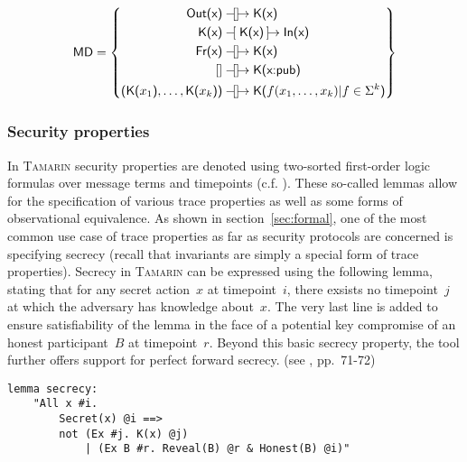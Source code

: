 \begin{equation*}
    \textsf{MD} = \left\{
        \begin{aligned}
            \textsf{Out(x)} &\ltracerule\rtracerule \textsf{K(x)}\\
            \textsf{K(x)} &\tracerule{\textsf{K(x)}} \textsf{In(x)}\\
            \textsf{Fr(x)} &\ltracerule\rtracerule \textsf{K(x)}\\
            [] &\ltracerule\rtracerule \textsf{K(x:pub)}\\
            \textsf{(K(}x_1\textsf{)}, \ldots, \textsf{K(}x_k\textsf{))} &\ltracerule\rtracerule \textsf{K(}f(x_1, \ldots, x_k) | f \in \Sigma^k\textsf{)}
        \end{aligned}
    \right\}
\end{equation*}

\subsubsection{Security properties}

In \textsc{Tamarin} security properties are denoted using two-sorted first-order logic formulas over message terms and timepoints (c.f. \cite{meier2013advancing}).
These so-called lemmas allow for the specification of various trace properties as well as some forms of observational equivalence.
As shown in section~\ref{sec:formal}, one of the most common use case of trace properties as far as security protocols are concerned is specifying secrecy (recall that invariants are simply a special form of trace properties).
Secrecy in \textsc{Tamarin} can be expressed using the following lemma, stating that for any secret action~$x$ at timepoint~$i$, there exsists no timepoint~$j$ at which the adversary has knowledge about~$x$.
The very last line is added to ensure satisfiability of the lemma in the face of a potential key compromise of an honest participant~$B$ at timepoint~$r$.
Beyond this basic secrecy property, the tool further offers support for perfect forward secrecy. (see \cite{tamarin2019manual}, pp.~71-72)

\begin{lstlisting}[caption={Tamarin secrecy query, according to \cite{tamarin2019manual}, p.~72},label={lst:tamarin-secrecy}]
lemma secrecy:
    "All x #i.
        Secret(x) @i ==>
        not (Ex #j. K(x) @j)
            | (Ex B #r. Reveal(B) @r & Honest(B) @i)"
\end{lstlisting}

